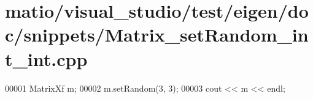 \hypertarget{matio_2visual__studio_2test_2eigen_2doc_2snippets_2_matrix__set_random__int__int_8cpp_source}{}\section{matio/visual\+\_\+studio/test/eigen/doc/snippets/\+Matrix\+\_\+set\+Random\+\_\+int\+\_\+int.cpp}
\label{matio_2visual__studio_2test_2eigen_2doc_2snippets_2_matrix__set_random__int__int_8cpp_source}

\begin{DoxyCode}
00001 MatrixXf m;
00002 m.setRandom(3, 3);
00003 cout << m << endl;
\end{DoxyCode}
